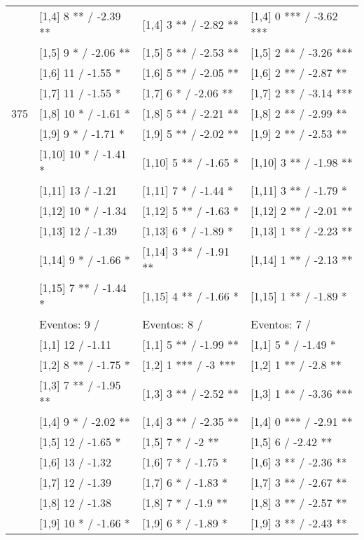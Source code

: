 \begin{table}
\begin{tabular}[t]{llll}
\addlinespace
 & {}[1,4] 8 ** / -2.39 ** & {}[1,4] 3 ** / -2.82 ** & {}[1,4] 0 *** / -3.62 ***\\
 & {}[1,5] 9 * / -2.06 ** & {}[1,5] 5 ** / -2.53 ** & {}[1,5] 2 ** / -3.26 ***\\
 & {}[1,6] 11  / -1.55 * & {}[1,6] 5 ** / -2.05 ** & {}[1,6] 2 ** / -2.87 **\\
 & {}[1,7] 11  / -1.55 * & {}[1,7] 6 * / -2.06 ** & {}[1,7] 2 ** / -3.14 ***\\
375 & {}[1,8] 10 * / -1.61 * & {}[1,8] 5 ** / -2.21 ** & {}[1,8] 2 ** / -2.99 **\\
\addlinespace
 & {}[1,9] 9 * / -1.71 * & {}[1,9] 5 ** / -2.02 ** & {}[1,9] 2 ** / -2.53 **\\
 & {}[1,10] 10 * / -1.41 * & {}[1,10] 5 ** / -1.65 * & {}[1,10] 3 ** / -1.98 **\\
 & {}[1,11] 13  / -1.21 & {}[1,11] 7 * / -1.44 * & {}[1,11] 3 ** / -1.79 *\\
 & {}[1,12] 10 * / -1.34 & {}[1,12] 5 ** / -1.63 * & {}[1,12] 2 ** / -2.01 **\\
 & {}[1,13] 12  / -1.39 & {}[1,13] 6 * / -1.89 * & {}[1,13] 1 ** / -2.23 **\\
\addlinespace
 & {}[1,14] 9 * / -1.66 * & {}[1,14] 3 ** / -1.91 ** & {}[1,14] 1 ** / -2.13 **\\
 & {}[1,15] 7 ** / -1.44 * & {}[1,15] 4 ** / -1.66 * & {}[1,15] 1 ** / -1.89 *\\
 & Eventos:  9 / & Eventos:  8 / & Eventos:  7 /\\
 & {}[1,1] 12  / -1.11 & {}[1,1] 5 ** / -1.99 ** & {}[1,1] 5 * / -1.49 *\\
 & {}[1,2] 8 ** / -1.75 * & {}[1,2] 1 *** / -3 *** & {}[1,2] 1 ** / -2.8 **\\
\addlinespace
 & {}[1,3] 7 ** / -1.95 ** & {}[1,3] 3 ** / -2.52 ** & {}[1,3] 1 ** / -3.36 ***\\
 & {}[1,4] 9 * / -2.02 ** & {}[1,4] 3 ** / -2.35 ** & {}[1,4] 0 *** / -2.91 **\\
 & {}[1,5] 12  / -1.65 * & {}[1,5] 7 * / -2 ** & {}[1,5] 6  / -2.42 **\\
 & {}[1,6] 13  / -1.32 & {}[1,6] 7 * / -1.75 * & {}[1,6] 3 ** / -2.36 **\\
 & {}[1,7] 12  / -1.39 & {}[1,7] 6 * / -1.83 * & {}[1,7] 3 ** / -2.67 **\\
\addlinespace
500 & {}[1,8] 12  / -1.38 & {}[1,8] 7 * / -1.9 ** & {}[1,8] 3 ** / -2.57 **\\
 & {}[1,9] 10 * / -1.66 * & {}[1,9] 6 * / -1.89 * & {}[1,9] 3 ** / -2.43 **\\

\end{tabular}
\end{table}
